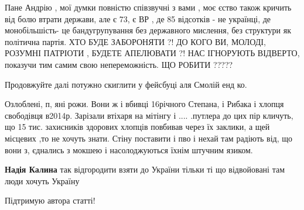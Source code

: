 \begin{itemize}
Пане Андрію , мої думки повністю співзвучні з вами , моє єство також кричить
від болю втрати держави, але є 73, є ВР , де 85 відсотків - не українці, де
монобільшість- це бандугрупування без державного мислення, без структури як
політична партія. ХТО БУДЕ ЗАБОРОНЯТИ ?! ДО КОГО ВИ, МОЛОДІ, РОЗУМНІ ПАТРІОТИ ,
БУДЕТЕ АПЕЛЮВАТИ ?! НАС ІГНОРУЮТЬ ВІДВЕРТО, показучи тим самим свою
непереможність. ЩО РОБИТИ ?????

\begin{itemize}
 
Продовжуйте далі потужно скиглити у фейсбуці аля Смолій енд ко.
\end{itemize}

 

Озлоблені, п, яні рожи. Вони ж і вбивці 16річного Степана, і Рибака і хлопця
свободівця в2014р. Зарізали втіхаря на мітінгу і .... .путлера до цих пір
кличуть, що 15 тис. захисників здорових хлопців повбивав через їх заклики, а щей
місцевих ,то не хочуть знати. Стіну поставити і пво і нехай там радіють від, що
вони з, єднались з мокшею і насолоджуються їхнім штучним язиком.

\begin{itemize}
 
\textbf{Надія Калина} так відгородити взяти до України тільки ті що відвойовані там люди хочуть Україну
\end{itemize}

 
Підтримую автора статті!


\end{itemize}
